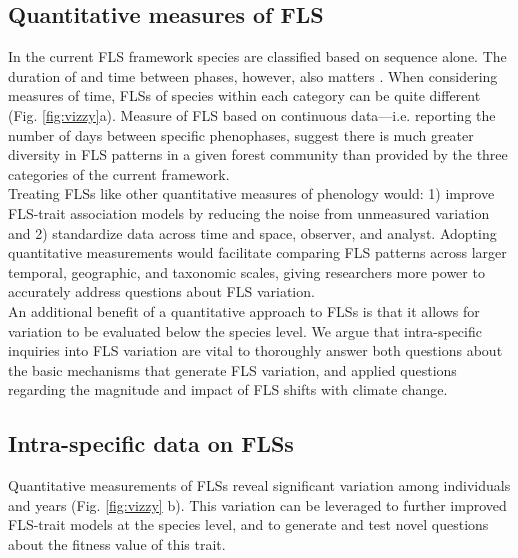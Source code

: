 \documentclass[11pt]{article}
\begin{document}
\subsection*{Quantitative measures of FLS}
\noindent In the current FLS framework species are classified based on sequence alone. The duration of and time between phases, however, also matters \citep{Inouye2019}. When considering measures of time, FLSs of species within each category can be quite different (Fig. \ref{fig:vizzy}a). Measure of FLS based on continuous data---i.e. reporting the number of days between specific phenophases, suggest there is much greater diversity in FLS patterns in a given forest community than provided by the three categories of the current framework.\\ 

\noindent Treating FLSs like other quantitative measures of phenology \citep[e.g. the BBCH scale,][]{Finn2007} would: 1) improve FLS-trait association models by reducing the noise from unmeasured variation and 2) standardize data across time and space, observer, and analyst. Adopting quantitative measurements would facilitate comparing FLS patterns across larger temporal, geographic, and taxonomic scales, giving researchers more power to accurately address questions about FLS variation.\\

\noindent An additional benefit of a quantitative approach to FLSs is that it allows for variation to be evaluated below the species level. We argue that intra-specific inquiries into FLS variation are vital to thoroughly answer both questions about the basic mechanisms that generate FLS variation, and applied questions regarding the magnitude and impact of FLS shifts with climate change.

\subsection*{Intra-specific data on FLSs}

\noindent Quantitative measurements of FLSs reveal significant variation among individuals and years (Fig. \ref{fig:vizzy} b). This variation can be leveraged to further improved FLS-trait models at the species level, and to generate and test novel questions about the fitness value of this trait.\\
\end{document}
